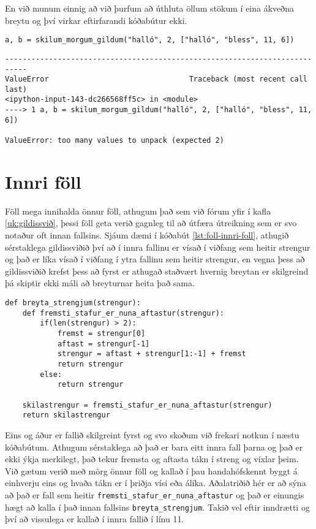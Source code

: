 En við munum einnig að við þurfum að úthluta öllum stökum í eina ákveðna breytu og því virkar eftirfarandi kóðabútur ekki.

\begin{lstlisting}[caption=Fallið úr kóðabút \ref{lst:foll-ndir-skilagildi} notað og skilagildunum úthlutað í breytur rangt, label=lst:foll-skil3]
a, b = skilum_morgum_gildum("halló", 2, ["halló", "bless", 11, 6])
\end{lstlisting}
\lstset{style=uttak}
\begin{lstlisting}
---------------------------------------------------------------------------
ValueError                                Traceback (most recent call last)
<ipython-input-143-dc266568ff5c> in <module>
----> 1 a, b = skilum_morgum_gildum("halló", 2, ["halló", "bless", 11, 6])

ValueError: too many values to unpack (expected 2)
\end{lstlisting}
\lstset{style=venjulegt}

\section{Innri föll}

Föll mega innihalda önnur föll, athugum það sem við fórum yfir í kafla \ref{uk:gildissvið}, þessi föll geta verið gagnleg til að útfæra útreikning sem er svo notaður oft innan fallsins.
Sjáum dæmi í kóðabút \ref{lst:foll-innri-foll}, athugið sérstaklega gildissviðið því að í innra fallinu er vísað í viðfang sem heitir strengur og það er líka vísað í viðfang í ytra fallinu sem heitir strengur, en vegna þess að gildissviðið krefst þess að fyrst er athugað staðvært hvernig breytan er skilgreind þá skiptir ekki máli að breyturnar heita það sama.


\begin{lstlisting}[caption=Innri föll kynnt, label=lst:foll-innri-foll]
def breyta_strengjum(strengur):
	def fremsti_stafur_er_nuna_aftastur(strengur):
		if(len(strengur) > 2):
			fremst = strengur[0]
			aftast = strengur[-1]
			strengur = aftast + strengur[1:-1] + fremst
			return strengur
		else:
			return strengur

	skilastrengur = fremsti_stafur_er_nuna_aftastur(strengur)
	return skilastrengur
\end{lstlisting}

Eins og áður er fallið skilgreint fyrst og svo skoðum við frekari notkun í næstu kóðabútum.
Athugum sérstaklega að það er bara eitt innra fall þarna og það er ekki ýkja merkilegt, það tekur fremsta og aftasta tákn í streng og víxlar þeim.
Við gætum verið með mörg önnur föll og kallað í þau handahófskennt byggt á einhverju eins og hvaða tákn er í þriðja vísi eða álíka.
Aðalatriðið hér er að sýna að það er fall sem heitir \texttt{fremsti\_stafur\_er\_nuna\_aftastur} og það er einungis hægt að kalla í það innan fallsins \texttt{breyta\_strengjum}.
Takið vel eftir inndrætti og því að vissulega er kallað í innra fallið í línu 11.

